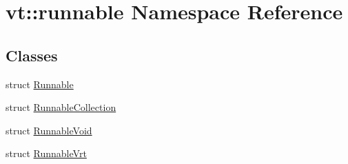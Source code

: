 \hypertarget{namespacevt_1_1runnable}{}\section{vt\+:\+:runnable Namespace Reference}
\label{namespacevt_1_1runnable}
\subsection*{Classes}
\begin{DoxyCompactItemize}
\item 
struct \hyperlink{structvt_1_1runnable_1_1_runnable}{Runnable}
\item 
struct \hyperlink{structvt_1_1runnable_1_1_runnable_collection}{Runnable\+Collection}
\item 
struct \hyperlink{structvt_1_1runnable_1_1_runnable_void}{Runnable\+Void}
\item 
struct \hyperlink{structvt_1_1runnable_1_1_runnable_vrt}{Runnable\+Vrt}
\end{DoxyCompactItemize}
